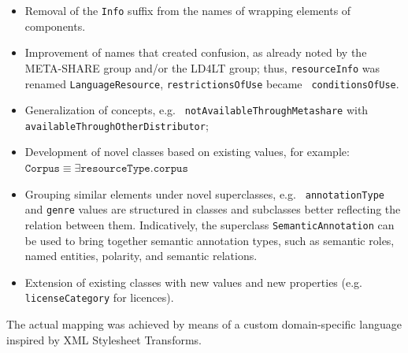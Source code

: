\documentclass{llncs}
\begin{document}
\begin{itemize}
    \item Removal of the {\tt Info} suffix from the names of  wrapping elements of
        components.
    \item Improvement of names that created confusion, as already noted by the
        META-SHARE group and/or the LD4LT group; thus, {\tt resourceInfo} was renamed
        {\tt LanguageResource}, {\tt restrictionsOfUse} became {\tt
        conditionsOfUse}.
    \item Generalization of concepts, e.g. {\tt
        not\-Available\-Through\-Metashare} with {\tt
        avai\-lable\-Through\-Other\-Distributor};
\item Development of novel classes based on existing values, for example:
    \\$\mathtt{Corpus} \equiv \exists \mathtt{resourceType}.\mathtt{corpus}$
\item Grouping similar elements under novel superclasses, e.g. {\tt
    annotationType} and {\tt genre} values are structured in classes and
    subclasses better reflecting the relation between them. Indicatively, the superclass
    {\tt SemanticAnnotation} can be used to bring together semantic annotation types,
    such as semantic roles, named entities, polarity, and semantic relations.
\item Extension of existing classes with new values and new properties
    (e.g. {\tt licenseCategory} for licences).
\end{itemize}

The actual mapping was achieved by means of a custom domain-specific language
inspired by XML Stylesheet Transforms.
\end{document}
